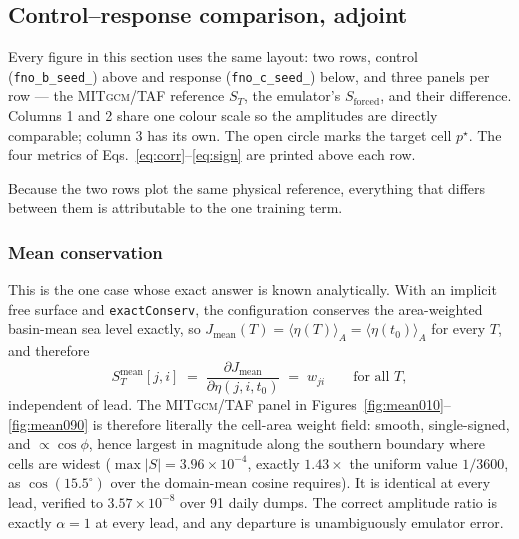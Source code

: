 \documentclass[3p,12pt]{elsarticle}
\newcommand{\MITgcm}{\textsc{MITgcm}}
\newcommand{\Sforced}{S_{\mathrm{forced}}}
\begin{document}
\subsection{Control--response comparison, adjoint}
\label{sec:adjoint}

Every figure in this section uses the same layout: two rows, control
(\texttt{fno\_b\_seed\_}) above and response
(\texttt{fno\_c\_seed\_}) below, and three panels per row --- the
\MITgcm{}/TAF reference $S_T$, the emulator's $\Sforced$, and their difference.
Columns 1 and 2 share one colour scale so the amplitudes are directly comparable;
column 3 has its own. The open circle marks the target cell $p^\star$. The four
metrics of Eqs.~\eqref{eq:corr}--\eqref{eq:sign} are printed above each row.

Because the two rows plot the same physical reference, everything that differs
between them is attributable to the one training term.

\subsubsection{Mean conservation}
\label{sec:mean}

This is the one case whose exact answer is known analytically. With an implicit
free surface and \texttt{exactConserv}, the configuration conserves the
area-weighted basin-mean sea level exactly, so
$J_{\mathrm{mean}}(T)=\langle\eta(T)\rangle_A=\langle\eta(t_0)\rangle_A$ for
every $T$, and therefore
\begin{equation}
S^{\mathrm{mean}}_{T}[j,i] \;=\; \frac{\partial J_{\mathrm{mean}}}{\partial\eta(j,i,t_0)}
\;=\; w_{ji} \qquad\text{for all }T,
\label{eq:meanexact}
\end{equation}
independent of lead. The \MITgcm{}/TAF panel in Figures~\ref{fig:mean010}--\ref{fig:mean090}
is therefore literally the cell-area weight field: smooth, single-signed, and
$\propto\cos\phi$, hence largest in magnitude along the southern boundary where
cells are widest ($\max|S|=3.96\times10^{-4}$, exactly $1.43\times$ the uniform
value $1/3600$, as $\cos(15.5^\circ)$ over the domain-mean cosine requires). It
is identical at every lead, verified to $3.57\times10^{-8}$ over 91 daily dumps.
The correct amplitude ratio is exactly $\alpha=1$ at every lead, and any
departure is unambiguously emulator error.
\end{document}
